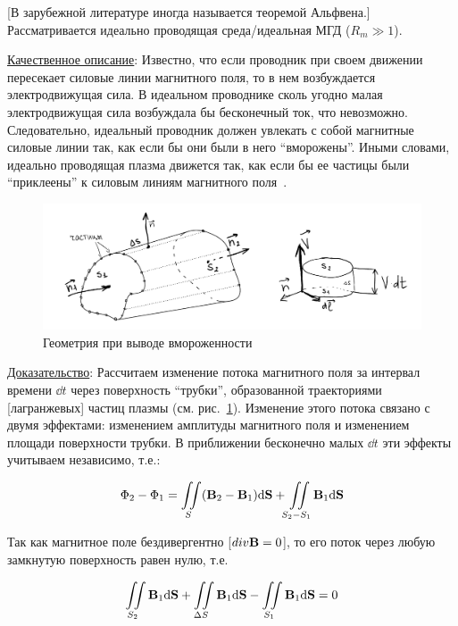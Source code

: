 \documentclass[10pt, a4paper]{article}
\begin{document}
[В зарубежной литературе иногда называется теоремой Альфвена.] Рассматривается идеально проводящая среда/идеальная МГД ($R_m \gg 1$). 

\uline{Качественное описание}: Известно, что если проводник при своем движении пересекает силовые линии магнитного поля, то в нем возбуждается электродвижущая сила. В идеальном проводнике сколь угодно малая электродвижущая сила возбуждала бы бесконечный ток, что невозможно. Следовательно, идеальный проводник должен увлекать с собой магнитные силовые линии так, как если бы они были в него ``вморожены''. Иными словами, идеально проводящая плазма движется так, как если бы ее частицы были ``приклеены'' к силовым линиям магнитного поля~\cite{frank}.

\begin{figure}[ht]
    \begin{center}
    	\includegraphics[width=1\linewidth]{5.flow.pdf}
   \end{center}	
    \caption{Геометрия при выводе вмороженности}
    \label{fig:Alfven_th_geom}
\end{figure}

\uline{Доказательство}: Рассчитаем изменение потока магнитного поля за интервал времени $\dd t$ через поверхность ``трубки'', образованной траекториями [лагранжевых] частиц плазмы (см. рис.~\ref{fig:Alfven_th_geom}). Изменение этого потока связано с двумя эффектами: изменением амплитуды магнитного поля и изменением площади поверхности трубки. В приближении бесконечно малых $\dd t$ эти эффекты учитываем независимо, т.е.:

\begin{equation} \label{eq:frozen_in_flow_diff}
	\Phi_2 - \Phi_1 = \iint\limits_S (\vb{B}_2 - \vb{B}_1)\dd \vb{S} + \iint\limits_{S_2 - S_1}\vb{B}_1\dd\vb{S}
\end{equation}

Так как магнитное поле бездивергентно [$div\vb{B}=0$], то его поток через любую замкнутую поверхность равен нулю, т.е.

\begin{equation*}
	\iint\limits_{S_2}\vb{B}_1\dd\vb{S} + \iint\limits_{\Delta S}\vb{B}_1\dd\vb{S} - \iint\limits_{S_1}\vb{B}_1\dd\vb{S} = 0
\end{equation*}
\end{document}
